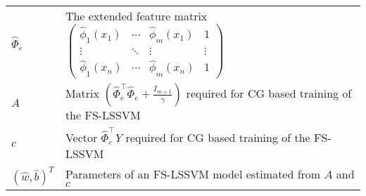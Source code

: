 \documentclass[master=mai,masteroption=ecs]{kulemt}
\begin{document}
\begin{flushleft}
\begin{tabularx}{\textwidth}{@{}p{12mm}X@{}}
    $\hat{\Phi}_e$ & The extended feature matrix $\begin{pmatrix}
\hat{\phi}_{1}(x_1) & \cdots & \hat{\phi}_{m}(x_1) & 1\\ 
\vdots &  \ddots & \vdots & \vdots\\ 
\hat{\phi}_{1}(x_n) & \cdots & \hat{\phi}_{m}(x_n) & 1
\end{pmatrix}$ \\
    $A$ & Matrix $\left (\hat{\Phi}^{\intercal}_e \hat{\Phi}_e + \frac{\mathit{I}_{m+1}}{\gamma} \right )$ required for CG based training of the FS-LSSVM\\
    $c$ & Vector $ \hat{\Phi}^{\intercal}_e Y$ required for CG based training of the FS-LSSVM\\
    $(\hat{w}, \hat{b})^T$ & Parameters of an FS-LSSVM model estimated from $A$ and $c$ \\
  \end{tabularx}
\end{flushleft}

\mainmatter








\appendixpage*          %
\appendix


%
\backmatter


\end{document}
